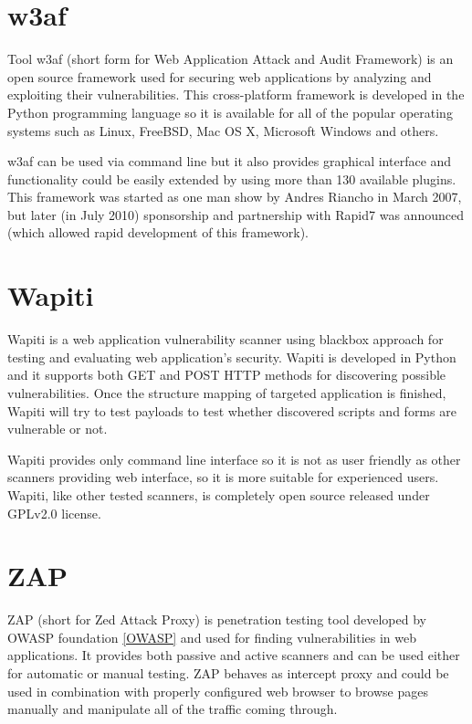 	\section{w3af}
	
	Tool w3af (short form for Web Application Attack and Audit Framework) \cite{w3af} is an open source framework used for securing web applications by analyzing and exploiting their vulnerabilities. This cross-platform framework is developed in the Python programming language so it is available for all of the popular operating systems such as Linux, FreeBSD, Mac OS X, Microsoft Windows and others.
	
	w3af can be used via command line but it also provides graphical interface and functionality could be easily extended by using more than 130 available plugins. This framework was started as one man show by Andres Riancho in March 2007, but later (in July 2010) sponsorship and partnership with Rapid7 was announced (which allowed rapid development of this framework).
			
	\section{Wapiti}
	
	Wapiti \cite{Wapiti} is a web application vulnerability scanner using black\-box approach for testing and evaluating web application's security. Wapiti is developed in Python and it supports both GET and POST HTTP methods for discovering possible vulnerabilities. Once the structure mapping of targeted application is finished, Wapiti will try to test payloads to test whether discovered scripts and forms are vulnerable or not.	
	
	Wapiti provides only command line interface so it is not as user friendly as other scanners providing web interface, so it is more suitable for experienced users. Wapiti, like other tested scanners, is completely open source released under GPLv2.0 \cite{GPLv2} license.

		
	\section{ZAP}
	
	ZAP (short for Zed Attack Proxy) \cite{ZAP} is penetration testing tool developed by OWASP foundation \ref{OWASP} and used for finding vulnerabilities in web applications. It provides both passive and active scanners and can be used either for automatic or manual testing. ZAP behaves as intercept proxy and could be used in combination with properly configured web browser to browse pages manually and manipulate all of the traffic coming through.
	
